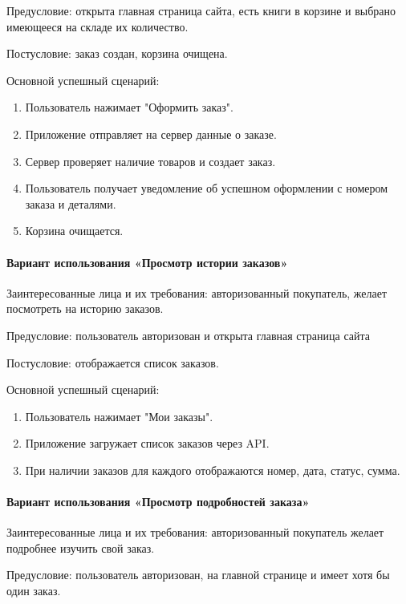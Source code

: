 Предусловие: открыта главная страница сайта, есть книги в корзине и выбрано имеющееся на складе их количество.

Постусловие: заказ создан, корзина очищена.

Основной успешный сценарий:

\begin{enumerate}
	\item Пользователь нажимает "Оформить заказ".
	\item Приложение отправляет на сервер данные о заказе.
	\item Сервер проверяет наличие товаров и создает заказ.
	\item Пользователь получает уведомление об успешном оформлении с номером заказа и деталями.
	\item Корзина очищается.
\end{enumerate}


\paragraph{Вариант использования «Просмотр истории заказов»}

Заинтересованные лица и их требования: авторизованный покупатель, желает посмотреть на историю заказов.

Предусловие: пользователь авторизован и открыта главная страница сайта

Постусловие: отображается список заказов.

Основной успешный сценарий:

\begin{enumerate}
	\item Пользователь нажимает "Мои заказы".
	\item Приложение загружает список заказов через API.
	\item При наличии заказов для каждого отображаются номер, дата, статус, сумма.
\end{enumerate}


\paragraph{Вариант использования «Просмотр подробностей заказа»}

Заинтересованные лица и их требования: авторизованный покупатель желает подробнее изучить свой заказ.

Предусловие: пользователь авторизован, на главной странице и имеет хотя бы один заказ.

